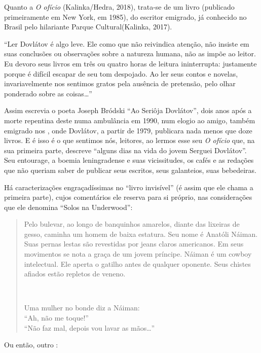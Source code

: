 {Quanto a \emph{O ofício} (Kalinka/Hedra, 2018), trata-se de um livro (publicado primeiramente em New York, em 1985), do escritor emigrado, já conhecido no Brasil pelo hilariante Parque Cultural(Kalinka, 2017).

``Ler Dovlátov é algo leve. Ele como que não reivindica atenção, não insiste em suas conclusões ou observações sobre a natureza humana, não as impõe ao leitor. Eu devoro seus livros em três ou quatro horas de leitura ininterrupta: justamente porque é difícil escapar de seu tom despojado. Ao ler seus contos e novelas, invariavelmente nos sentimos gratos pela ausência de pretensão, pelo olhar ponderado sobre as coisas\ldots{}''

Assim escrevia o poeta Joseph Bródski  ``Ao Seriôja Dovlátov'', dois anos após a morte repentina deste numa ambulância em 1990, num elogio ao amigo, também emigrado nos , onde Dovlátov, a partir de 1979, publicara nada menos que doze livros. E é isso é o que sentimos nós, leitores, ao lermos esse seu \emph{O ofício} que, na sua primeira parte, descreve ``alguns dias na vida do jovem Serguei Dovlátov''. Seu entourage, a boemia leningradense e suas vicissitudes, os cafés e as redações que não queriam saber de publicar seus escritos, seus galanteios, suas bebedeiras. 

Há caracterizações engraçadíssimas no ``livro invisível'' (é assim que ele chama a primeira parte), cujos comentários ele reserva para si próprio, nas considerações que ele denomina ``Solos na Underwood'': 

\begin{quote}
Pelo bulevar, ao longo de banquinhos amarelos, diante das lixeiras de gesso, caminha um homem de baixa estatura. Seu nome é Anatóli Náiman.
Suas pernas lestas são revestidas por jeans claros americanos. Em seus movimentos se nota a graça de um jovem príncipe. Náiman é um cowboy intelectual. Ele aperta o gatilho antes de qualquer oponente. Seus chistes afiados estão repletos de veneno. 

\begin{center}
\\
\end{center}
Uma mulher no bonde diz a Náiman: \\
``Ah, não me toque!'' \\
``Não faz mal, depois vou lavar as mãos\ldots{}''
\end{quote}

Ou então, outro :

}
